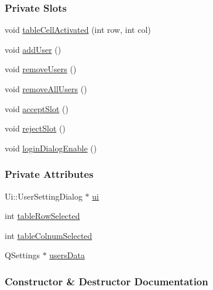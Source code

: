 \subsubsection*{Private Slots}
\begin{DoxyCompactItemize}
\item 
void \mbox{\hyperlink{classUserSettingDialog_adadac0b6a157e4fc15b5490f4e15b672}{table\+Cell\+Activated}} (int row, int col)
\item 
void \mbox{\hyperlink{classUserSettingDialog_a699172ed3d826f47823a5c7b2ee01cba}{add\+User}} ()
\item 
void \mbox{\hyperlink{classUserSettingDialog_a0c45242e9e0dc1ad4cf1960cca3575a4}{remove\+Users}} ()
\item 
void \mbox{\hyperlink{classUserSettingDialog_a5f4c353f8768d0225ac84f85607c4b54}{remove\+All\+Users}} ()
\item 
void \mbox{\hyperlink{classUserSettingDialog_a2efff8a9633f90bd27c990180b87b104}{accept\+Slot}} ()
\item 
void \mbox{\hyperlink{classUserSettingDialog_a46828cbc27d2dd2c587388090207dd8e}{reject\+Slot}} ()
\item 
void \mbox{\hyperlink{classUserSettingDialog_a9d077edc4d7cc247f8e57d1d6e8d7f89}{login\+Dialog\+Enable}} ()
\end{DoxyCompactItemize}
\subsubsection*{Private Attributes}
\begin{DoxyCompactItemize}
\item 
Ui\+::\+User\+Setting\+Dialog $\ast$ \mbox{\hyperlink{classUserSettingDialog_a915e2e661a7fe6fd265ec878f749cc82}{ui}}
\item 
int \mbox{\hyperlink{classUserSettingDialog_a965aa0e041af26cff9011bd8a04ad84c}{table\+Row\+Selected}}
\item 
int \mbox{\hyperlink{classUserSettingDialog_af4035cc2f93695c059c82ecd28ea70c8}{table\+Colnum\+Selected}}
\item 
Q\+Settings $\ast$ \mbox{\hyperlink{classUserSettingDialog_a2ea2a798911a3e2840542d7190613027}{users\+Data}}
\end{DoxyCompactItemize}


\subsubsection{Constructor \& Destructor Documentation}
\mbox{\label{classUserSettingDialog_a8d3526dd76e3bf77fb8e02e1febeb8e4}} 
